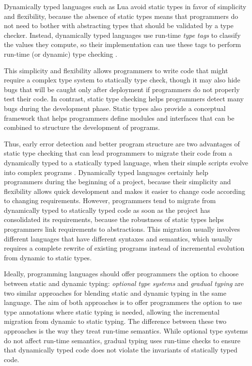 Dynamically typed languages such as Lua avoid static types in favor of
simplicity and flexibility, because the absence of static types means
that programmers do not need to bother with abstracting types that
should be validated by a type checker.
Instead, dynamically typed languages use run-time \emph{type tags}
to classify the values they compute, so their implementation can use
these tags to perform run-time (or dynamic) type checking
\citep{pierce2002tpl}.

This simplicity and flexibility allows programmers to write code that
might require a complex type system to statically type check,
though it may also hide bugs that will be caught only after deployment
if programmers do not properly test their code.
In contrast, static type checking helps programmers detect many
bugs during the development phase.
Static types also provide a conceptual framework that helps
programmers define modules and interfaces that can be combined to
structure the development of programs.

Thus, early error detection and better program structure are two
advantages of static type checking that can lead programmers to
migrate their code from a dynamically typed to a statically
typed language, when their simple scripts evolve into complex programs
\citep{tobin-hochstadt2006ims}.
Dynamically typed languages certainly help programmers during the
beginning of a project, because their simplicity and flexibility
allows quick development and makes it easier to change code according to
changing requirements.
However, programmers tend to migrate from dynamically typed to
statically typed code as soon as the project has consolidated its
requirements, because the robustness of static types helps
programmers link requirements to abstractions.
This migration usually involves different languages that have
different syntaxes and semantics, which usually requires a complete
rewrite of existing programs instead of incremental evolution from
dynamic to static types.

Ideally, programming languages should offer programmers the
option to choose between static and dynamic typing:
\emph{optional type systems} \citep{bracha2004pluggable} and
\emph{gradual typing} \citep{siek2006gradual} are two similar
approaches for blending static and dynamic typing in the same
language.
The aim of both approaches is to offer programmers the option
to use type annotations where static typing is needed,
allowing the incremental migration from dynamic to static typing.
The difference between these two approaches is the way they treat
run-time semantics.
While optional type systems do not affect run-time semantics,
gradual typing uses run-time checks to ensure that dynamically typed
code does not violate the invariants of statically typed code.

